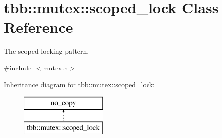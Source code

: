 \hypertarget{classtbb_1_1mutex_1_1scoped__lock}{}\section{tbb\+:\+:mutex\+:\+:scoped\+\_\+lock Class Reference}
\label{classtbb_1_1mutex_1_1scoped__lock}


The scoped locking pattern.  




{\ttfamily \#include $<$mutex.\+h$>$}

Inheritance diagram for tbb\+:\+:mutex\+:\+:scoped\+\_\+lock\+:\begin{figure}[H]
\begin{center}
\leavevmode
\includegraphics[height=2.000000cm]{classtbb_1_1mutex_1_1scoped__lock}
\end{center}
\end{figure}
